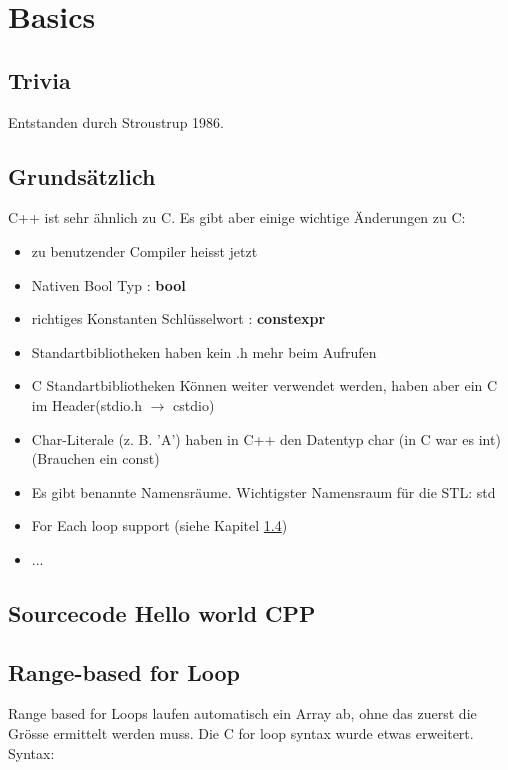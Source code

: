 \section{Basics}

\subsection{Trivia}

Entstanden durch Stroustrup 1986.

\subsection{Grundsätzlich}

C++ ist sehr ähnlich zu C. Es gibt aber einige wichtige Änderungen zu C:

\begin{itemize}[itemsep=1pt, parsep=0pt]
    \item zu benutzender Compiler heisst jetzt 
    \item Nativen Bool Typ : \textbf{bool}
    \item richtiges Konstanten Schlüsselwort : \textbf{constexpr}
    \item Standartbibliotheken haben kein .h mehr beim Aufrufen
    \item C Standartbibliotheken Können weiter verwendet werden, haben aber ein C im Header(stdio.h $\rightarrow$ cstdio)
    \item Char-Literale (z. B. 'A') haben in C++ den Datentyp char (in C war es int)(Brauchen ein const)
    \item Es gibt benannte Namensräume. Wichtigster Namensraum für die STL: std
    \item For Each loop support (siehe Kapitel \ref{forEach})
    \item ...
\end{itemize}

\subsection{Sourcecode Hello world CPP}



\subsection{Range-based for Loop}\label{forEach}

Range based for Loops laufen automatisch ein Array ab, ohne das zuerst die Grösse ermittelt werden muss. 
Die C for loop syntax wurde etwas erweitert.
Syntax:

